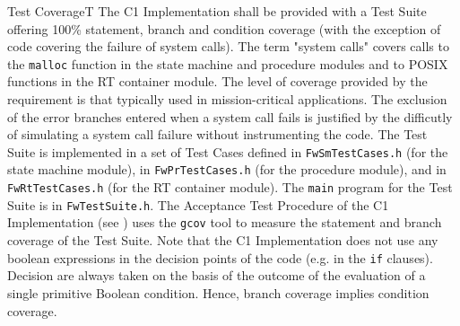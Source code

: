 \documentclass[requirements]{../fwprofile}
\begin{document}
\begin{fw_req_note}{Test Coverage}{T}
{The C1 Implementation shall be provided with a Test Suite offering 
100\% statement, branch and condition coverage 
(with the exception of code covering the failure of system calls).}
{The term "system calls" covers calls to the \texttt{malloc} function in the state machine and procedure modules and to POSIX functions in the RT container module.}
{The level of coverage provided by the requirement is that typically 
used in mission-critical applications. 
The exclusion of the error branches entered when a system call fails is justified 
by the difficutly of simulating a system call failure without instrumenting the code.}
{The Test Suite is implemented in a set of Test Cases defined 
in \texttt{FwSmTestCases.h} (for the state machine module), in \texttt{FwPrTestCases.h} 
(for the procedure module), and in \texttt{FwRtTestCases.h} 
(for the RT container module). 
The \texttt{main} program for the Test Suite is in \texttt{FwTestSuite.h}.} 
{The Acceptance Test Procedure of the C1 Implementation (see \cite{ref:um}) uses the \texttt{gcov} tool to measure the statement and branch coverage of the Test Suite. 
Note that the C1 Implementation does not use any boolean expressions in the decision 
points of the code (e.g. in the \texttt{if} clauses). 
Decision are always taken on the basis of the outcome of the evaluation of a 
single primitive Boolean condition. 
Hence, branch coverage implies condition coverage.}
\end{fw_req_note}
\end{document}

